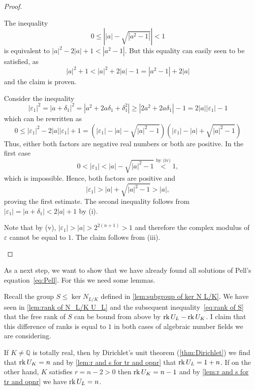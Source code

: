 \begin{proof}
\begin{plist}
    \item The inequality
    \[
      0 ≤ \left\vert |a| - \sqrt{|a^2 - 1|} \right\vert < 1
    \]
    is equivalent to \(|a|^2 - 2 |a| + 1 < |a^2 - 1|\). But this equality can easily seen to be satisfied, as
    \[
      |a|^2 + 1 < |a|^2 + 2|a| - 1 = |a^2 - 1| + 2 |a|
    \]
    and the claim is proven.

    \item Consider the inequality
    \[
      |ε_1|^2 = |a + δ_1|^2 = |a^2 + 2 a δ_1 + δ_1^2| ≥ |2a^2 + 2a δ_1| - 1 = 2 |a| |ε_1| - 1
    \]
    which can be rewritten as
    \[
      0 ≤ |ε_1|^2 - 2 |a| |ε_1| + 1 = \left(|ε_1| - |a| - \sqrt{|a|^2 - 1}\right) \left(|ε_1| - |a| + \sqrt{|a|^2 - 1}\right)
    \]
    Thus, either both factors are negative real numbers or both are positive. In the first case
    \[
      0 < |ε_1| < |a| - \sqrt{|a|^2 - 1} \overset{\text{by (iv)}}{<} 1,
    \]
    which is impossible. Hence, both factors are positive and
    \[
      |ε_1| > |a| + \sqrt{|a|^2 - 1}  > |a|,
    \]
    proving the first estimate. The second inequality follows from \(|ε_1| = |a + δ_1| < 2|a| + 1\) by (i).

    \item Note that by (v), \(|ε_1| > |a| > 2^{2(n + 1)} > 1\) and therefore the
    complex modulus of \(ε\) cannot be equal to \(1\). The claim follows from
    (iii).
  \end{plist}
\end{proof}

As a next step, we want to show that we have already found all solutions of
Pell's equation~\eqref{eq:Pell}. For this we need some lemmas.

Recall the group \(S ≤ \ker N_{L / K}\) defined in \cref{lem:subgroup of ker N
L/K}. We have seen in \cref{lem:rank of N_L/K U_L} and the subsequent
inequality~\eqref{eq:rank of S} that the free rank of \(S\) can be bound from
above by \(\operatorname{rk} U_L - \operatorname{rk} U_K\). I claim that this difference of ranks is equal
to \(1\) in both cases of algebraic number fields we are considering.

If \(K ≠ ℚ\) is totally real, then by Dirichlet's unit theorem
(\cref{thm:Dirichlet}) we find that \(\operatorname{rk} U_K = n\) and by \cref{lem:r and s for
tr and opnr} that \(\operatorname{rk} U_L = 1 + n\). If on the other hand, \(K\) satisfies
\(r = n - 2 > 0\) then \(\operatorname{rk} U_K = n - 1\) and by \cref{lem:r and s for tr and
opnr} we have \(\operatorname{rk} U_L = n\).

